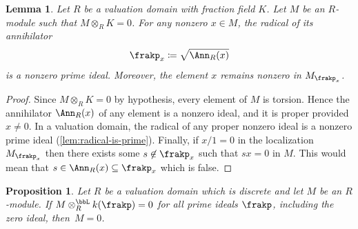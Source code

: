 \documentclass{amsart}
\numberwithin{equation}{section}%
\newtheorem{Prop}[equation]{Proposition}
\newtheorem{Lem}[equation]{Lemma}
\theoremstyle{remark}
\begin{document}
\begin{Lem}\label{lem:annihilator-prime}
	Let $R$ be a valuation domain with fraction field $K$. Let $M$ be an $R$-module such that $M \otimes_R K =0$. For any nonzero $x \in M$, the radical of its annihilator 
	\[
		\frakp_x \coloneqq \sqrt{\Ann_R(x)}
	\]
	is a nonzero prime ideal. Moreover, the element $x$ remains nonzero in $M_{\frakp_x}$.
\end{Lem}

\begin{proof}
  Since $M \otimes_R K = 0$ by hypothesis, every element of $M$ is torsion. Hence the annihilator $\Ann_R(x)$ of any element is a nonzero ideal, and it is proper provided $x \neq 0$. In a valuation domain, the radical of any proper nonzero ideal is a nonzero prime ideal (\cref{lem:radical-is-prime}). Finally, if $x/1 =0$ in the localization $M_{\frakp_x}$ then there exists some $s \not\in \frakp_x$ such that $sx=0$ in $M$. This would mean that $s \in \Ann_R(x) \subseteq \frakp_x$ which is false.
\end{proof}

\begin{Prop}\label{prop:detection-for-modules}
  Let $R$ be a valuation domain which is discrete and let $M$ be an $R$-module. If $M \otimes_R^{\bbL}  k(\frakp) = 0$ for all prime ideals $\frakp$, including the zero ideal, then~$M=0$.
\end{Prop}
\end{document}
